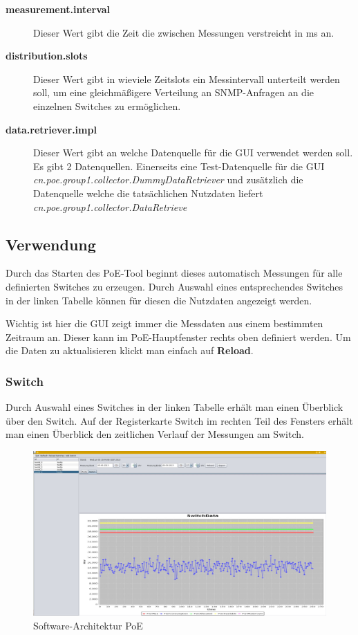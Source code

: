 \begin{description}
  \item [\textbf{measurement.interval}] Dieser Wert gibt die Zeit die zwischen
  Messungen verstreicht in ms an.
  \item [\textbf{distribution.slots}] Dieser Wert gibt in wieviele Zeitslots ein
  Messintervall unterteilt werden soll, um eine gleichmäßigere Verteilung an
  SNMP-Anfragen an die einzelnen Switches zu ermöglichen.
  \item [\textbf{data.retriever.impl}] Dieser Wert gibt an welche Datenquelle
  für die GUI verwendet werden soll. Es gibt 2 Datenquellen. Einerseits eine
  Test-Datenquelle für die GUI
  \textit{cn.poe.group1.collector.DummyDataRetriever} und zusätzlich die
  Datenquelle welche die tatsächlichen Nutzdaten liefert \textit{cn.poe.group1.collector.DataRetrieve}
\end{description}

\subsection{Verwendung}

Durch das Starten des PoE-Tool beginnt dieses automatisch Messungen für alle
definierten Switches zu erzeugen. Durch Auswahl eines entsprechendes Switches in
der linken Tabelle  können für diesen die Nutzdaten angezeigt werden.

Wichtig ist hier die GUI zeigt immer die Messdaten aus einem bestimmten Zeitraum
an. Dieser kann im PoE-Hauptfenster rechts oben definiert werden. Um die Daten
zu aktualisieren klickt man einfach auf \textbf{Reload}.

\subsubsection{Switch}

Durch Auswahl eines Switches in der linken Tabelle erhält man einen Überblick
über den Switch. Auf der Registerkarte Switch im rechten Teil des Fensters
erhält man einen Überblick den zeitlichen Verlauf der Messungen am Switch.

\begin{figure}[h]
    \centering
    \leavevmode
    \includegraphics[width=1.0\linewidth]{figures/screenshot2.jpg}
    \caption{Software-Architektur PoE}
    \label{fig:Ports-PoE}
\end{figure}


